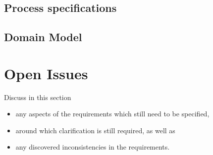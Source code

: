 \documentclass[a4paper,12pt]{article}
\begin{document}
\subsection{Process specifications}

\subsection{Domain Model}

\section{Open Issues}

Discuss in this section
\begin{itemize}
\item any aspects of the requirements which still need to be specified,
\item around which clarification is still required, as well as
\item any discovered inconsistencies in the requirements.
\end{itemize}
\end{document}
